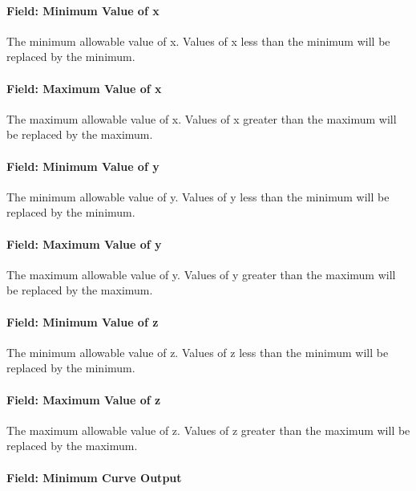\paragraph{Field: Minimum Value of x}\label{field-minimum-value-of-x-18}

The minimum allowable value of x. Values of x less than the minimum will be replaced by the minimum.

\paragraph{Field: Maximum Value of x}\label{field-maximum-value-of-x-19}

The maximum allowable value of x. Values of x greater than the maximum will be replaced by the maximum.

\paragraph{Field: Minimum Value of y}\label{field-minimum-value-of-y-7}

The minimum allowable value of y. Values of y less than the minimum will be replaced by the minimum.

\paragraph{Field: Maximum Value of y}\label{field-maximum-value-of-y-7}

The maximum allowable value of y. Values of y greater than the maximum will be replaced by the maximum.

\paragraph{Field: Minimum Value of z}\label{field-minimum-value-of-z-3}

The minimum allowable value of z. Values of z less than the minimum will be replaced by the minimum.

\paragraph{Field: Maximum Value of z}\label{field-maximum-value-of-z-3}

The maximum allowable value of z. Values of z greater than the maximum will be replaced by the maximum.

\paragraph{Field: Minimum Curve Output}\label{field-minimum-curve-output-quintlinear}

